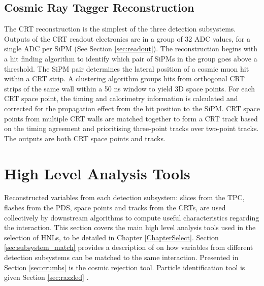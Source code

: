 \subsection{Cosmic Ray Tagger Reconstruction}
\label{sec:crt_reco}

The CRT reconstruction is the simplest of the three detection subsystems.
Outputs of the CRT readout electronics are in a group of 32 ADC values, for a single ADC per SiPM (See Section \ref{sec:readout}).
The reconstruction begins with a hit finding algorithm to identify which pair of SiPMs in the group goes above a threshold.
The SiPM pair determines the lateral position of a cosmic muon hit within a CRT strip.
A clustering algorithm groups hits from orthogonal CRT strips of the same wall within a 50 ns window to yield 3D space points.
For each CRT space point, the timing and calorimetry information is calculated and corrected for the propagation effect from the hit position to the SiPM.
CRT space points from multiple CRT walls are matched together to form a CRT track based on the timing agreement and prioritising three-point tracks over two-point tracks.
The outputs are both CRT space points and tracks. 


\section{High Level Analysis Tools}
\label{sec:reco_ana_tools}

Reconstructed variables from each detection subsystem: slices from the TPC, flashes from the PDS, space points and tracks from the CRTs, are used collectively by downstream algorithms to compute useful characteristics regarding the interaction.
This section covers the main high level analysis tools used in the selection of HNLs, to be detailed in Chapter \ref{ChapterSelect}.
Section \ref{sec:subsystem_match} provides a description of on how variables from different detection subsystems can be matched to the same interaction.
Presented in Section \ref{sec:crumbs} is the cosmic rejection tool.
Particle identification tool is given Section \ref{sec:razzled} .

